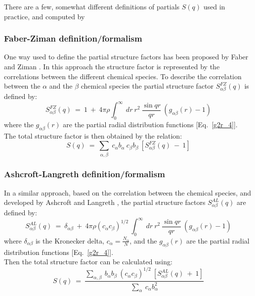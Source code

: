 There are a few, somewhat different definitions of partials $S(q)$ used in practice, and computed by \atomes

\subsubsection{Faber-Ziman definition/formalism}
One way used to define the partial structure factors has been proposed by Faber and Ziman \cite{PhilMag.11.153}. 
In this approach the structure factor is represented by the correlations between the different chemical species. To describe the correlation between the $\alpha$ and the $\beta$ chemical species the partial structure factor $S^{FZ}_{\alpha \beta}(q)$ is defined by:
\begin{equation}
\label{sqp0}
S^{FZ}_{\alpha \beta}(q)\ =\ 1\ +\ 4 \pi \rho \int_{0}^{\infty}\ dr\ r^{2}\ \frac{\sin qr}{qr}\ \left(g_{\alpha \beta}(r)-1\right)
\end{equation}
where the $g_{\alpha \beta}(r)$ are the partial radial distribution functions [Eq.~\ref{g2r_4}]. \\
The total structure factor is then obtained by the relation:
\begin{equation}
\label{sqp1}
S(q)\ =\ \sum_{\alpha,\beta}\ c_{\alpha} b_{\alpha}\ c_{\beta} b_{\beta}\ \left[S^{FZ}_{\alpha \beta}(q)\ -\ 1\right]
\end{equation}

\subsubsection{Ashcroft-Langreth definition/formalism}
In a similar approach, based on the correlation between the chemical species, and developed by Ashcroft and Langreth \cite{PhysRev.156.685,PhysRev.159.500,PhysRev.166.934.2}, the partial structure factors $S^{AL}_{\alpha \beta}(q)$ are defined by:
\begin{equation}
\label{sqp2}
S^{AL}_{\alpha \beta}(q)\ =\ \delta_{\alpha \beta}\ +\ 4 \pi \rho \left({c_\alpha c_\beta}\right)^{1/2}\ \int_{0}^{\infty}\ dr\ r^{2}\ \frac{\sin qr}{qr}\ \left(g_{\alpha \beta}(r)-1\right)
\end{equation}
where $\delta_{\alpha \beta}$ is the Kronecker delta, $c_\alpha = \displaystyle{\frac{N_\alpha}{N}}$, and the $g_{\alpha \beta}(r)$ are the partial radial distribution functions [Eq.~\ref{g2r_4}]. \\
Then the total structure factor can be calculated using:
\begin{equation}
\label{sqp3}
S(q)\ =\ \frac{\displaystyle{\sum_{\alpha, \beta}}\ b_\alpha b_\beta\ \left({c_\alpha c_\beta}\right)^{1/2}\ \left[S^{AL}_{\alpha \beta}(q)\ +\ 1\right]}{\displaystyle\sum_{\alpha}\ c_\alpha b_\alpha^2}
\end{equation}


